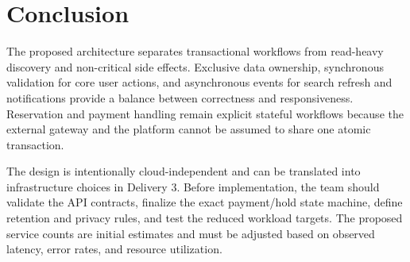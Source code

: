 \section{Conclusion}
\label{ch:reflection}
The proposed architecture separates transactional workflows from read-heavy discovery and non-critical side effects. Exclusive data ownership, synchronous validation for core user actions, and asynchronous events for search refresh and notifications provide a balance between correctness and responsiveness. Reservation and payment handling remain explicit stateful workflows because the external gateway and the platform cannot be assumed to share one atomic transaction.

The design is intentionally cloud-independent and can be translated into infrastructure choices in Delivery 3. Before implementation, the team should validate the API contracts, finalize the exact payment/hold state machine, define retention and privacy rules, and test the reduced workload targets. The proposed service counts are initial estimates and must be adjusted based on observed latency, error rates, and resource utilization.